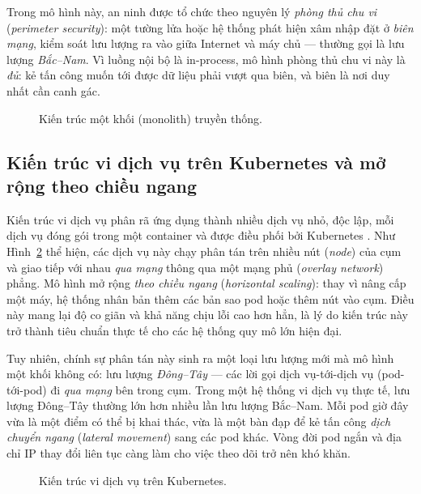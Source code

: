 Trong mô hình này, an ninh được tổ chức theo nguyên lý \emph{phòng thủ chu vi}
(\textit{perimeter security}): một tường lửa hoặc hệ thống phát hiện xâm nhập đặt ở
\emph{biên mạng}, kiểm soát lưu lượng ra vào giữa Internet và máy chủ --- thường gọi là
lưu lượng \emph{Bắc--Nam}. Vì luồng nội bộ là in-process, mô hình phòng thủ chu vi này
là \emph{đủ}: kẻ tấn công muốn tới được dữ liệu phải vượt qua biên, và biên là nơi duy
nhất cần canh gác.

\begin{figure}[H]
  \centering
  \resizebox{0.82\linewidth}{!}{}
  \caption{Kiến trúc một khối (monolith) truyền thống.}
  \label{fig:arch-monolith}
\end{figure}

\subsection{Kiến trúc vi dịch vụ trên Kubernetes và mở rộng theo chiều ngang}

Kiến trúc vi dịch vụ phân rã ứng dụng thành nhiều dịch vụ nhỏ, độc lập, mỗi dịch vụ đóng
gói trong một container và được điều phối bởi Kubernetes \cite{berardi2022microservice}.
Như Hình~\ref{fig:arch-micro} thể hiện, các dịch vụ này chạy phân tán trên nhiều nút
(\textit{node}) của cụm và giao tiếp với nhau \emph{qua mạng} thông qua một mạng phủ
(\textit{overlay network}) phẳng. Mô hình mở rộng \emph{theo chiều ngang} (\textit{horizontal
scaling}): thay vì nâng cấp một máy, hệ thống nhân bản thêm các bản sao pod hoặc thêm nút
vào cụm. Điều này mang lại độ co giãn và khả năng chịu lỗi cao hơn hẳn, là lý do kiến trúc
này trở thành tiêu chuẩn thực tế cho các hệ thống quy mô lớn hiện đại.

Tuy nhiên, chính sự phân tán này sinh ra một loại lưu lượng mới mà mô hình một khối không
có: lưu lượng \emph{Đông--Tây} --- các lời gọi dịch vụ-tới-dịch vụ (pod-tới-pod) đi
\emph{qua mạng} bên trong cụm. Trong một hệ thống vi dịch vụ thực tế, lưu lượng Đông--Tây
thường lớn hơn nhiều lần lưu lượng Bắc--Nam. Mỗi pod giờ đây vừa là một điểm có thể bị
khai thác, vừa là một bàn đạp để kẻ tấn công \emph{dịch chuyển ngang} (\textit{lateral
movement}) sang các pod khác. Vòng đời pod ngắn và địa chỉ IP thay đổi liên tục càng làm
cho việc theo dõi trở nên khó khăn.

\begin{figure}[H]
  \centering
  \resizebox{0.92\linewidth}{!}{}
  \caption{Kiến trúc vi dịch vụ trên Kubernetes.}
  \label{fig:arch-micro}
\end{figure}

